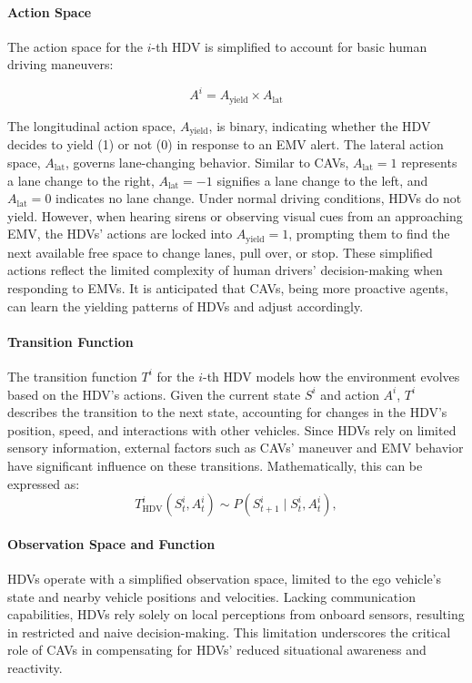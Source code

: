\paragraph{Action Space}
The action space for the \(i\)-th HDV is simplified to account for basic human driving maneuvers:

\begin{equation}
A^{i} = A_{\text{yield}} \times A_{\text{lat}}
\end{equation}

The longitudinal action space, \(A_{\text{yield}}\), is binary, indicating whether the HDV decides to yield (1) or not (0) in response to an EMV alert. The lateral action space, \(A_{\text{lat}}\), governs lane-changing behavior. Similar to CAVs, \(A_{\text{lat}} = 1\) represents a lane change to the right, \(A_{\text{lat}} = -1\) signifies a lane change to the left, and \(A_{\text{lat}} = 0\) indicates no lane change. Under normal driving conditions, HDVs do not yield. However, when hearing sirens or observing visual cues from an approaching EMV, the HDVs' actions are locked into \(A_{\text{yield}} = 1\), prompting them to find the next available free space to change lanes, pull over, or stop. These simplified actions reflect the limited complexity of human drivers' decision-making when responding to EMVs. It is anticipated that CAVs, being more proactive agents, can learn the yielding patterns of HDVs and adjust accordingly.

\paragraph{Transition Function}
The transition function \(T^i\) for the \(i\)-th HDV models how the environment evolves based on the HDV’s actions. Given the current state \(S^i\) and action \(A^i\), \(T^i\) describes the transition to the next state, accounting for changes in the HDV’s position, speed, and interactions with other vehicles. Since HDVs rely on limited sensory information, external factors such as CAVs' maneuver and EMV behavior have significant influence on these transitions. Mathematically, this can be expressed as:
\[
T^i_{\text{HDV}}(S^i_t, A^i_t) \sim P(S^i_{t+1} \mid S^i_t, A^i_t),
\]

\paragraph{Observation Space and Function}
HDVs operate with a simplified observation space, limited to the ego vehicle's state and nearby vehicle positions and velocities. Lacking communication capabilities, HDVs rely solely on local perceptions from onboard sensors, resulting in restricted and naive decision-making. This limitation underscores the critical role of CAVs in compensating for HDVs' reduced situational awareness and reactivity.

